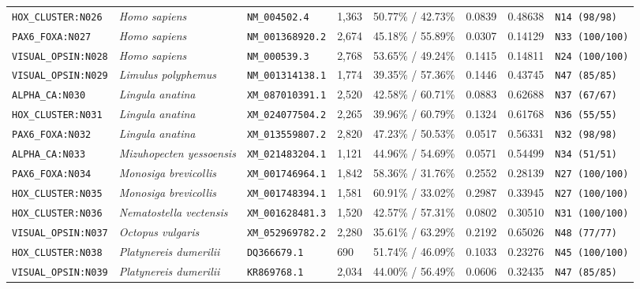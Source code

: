 \documentclass[10pt,letterpaper]{article}
\begin{document}
\begin{longtable}{llllllll}
\texttt{HOX\_CLUSTER:N026} & \textit{Homo sapiens} & \texttt{NM\_004502.4} & 1,363 & 50.77\% / 42.73\% & 0.0839 & 0.48638 & \texttt{N14 (98/98)} \\
\texttt{PAX6\_FOXA:N027} & \textit{Homo sapiens} & \texttt{NM\_001368920.2} & 2,674 & 45.18\% / 55.89\% & 0.0307 & 0.14129 & \texttt{N33 (100/100)} \\
\texttt{VISUAL\_OPSIN:N028} & \textit{Homo sapiens} & \texttt{NM\_000539.3} & 2,768 & 53.65\% / 49.24\% & 0.1415 & 0.14811 & \texttt{N24 (100/100)} \\
\texttt{VISUAL\_OPSIN:N029} & \textit{Limulus polyphemus} & \texttt{NM\_001314138.1} & 1,774 & 39.35\% / 57.36\% & 0.1446 & 0.43745 & \texttt{N47 (85/85)} \\
\texttt{ALPHA\_CA:N030} & \textit{Lingula anatina} & \texttt{XM\_087010391.1} & 2,520 & 42.58\% / 60.71\% & 0.0883 & 0.62688 & \texttt{N37 (67/67)} \\
\texttt{HOX\_CLUSTER:N031} & \textit{Lingula anatina} & \texttt{XM\_024077504.2} & 2,265 & 39.96\% / 60.79\% & 0.1324 & 0.61768 & \texttt{N36 (55/55)} \\
\texttt{PAX6\_FOXA:N032} & \textit{Lingula anatina} & \texttt{XM\_013559807.2} & 2,820 & 47.23\% / 50.53\% & 0.0517 & 0.56331 & \texttt{N32 (98/98)} \\
\texttt{ALPHA\_CA:N033} & \textit{Mizuhopecten yessoensis} & \texttt{XM\_021483204.1} & 1,121 & 44.96\% / 54.69\% & 0.0571 & 0.54499 & \texttt{N34 (51/51)} \\
\texttt{PAX6\_FOXA:N034} & \textit{Monosiga brevicollis} & \texttt{XM\_001746964.1} & 1,842 & 58.36\% / 31.76\% & 0.2552 & 0.28139 & \texttt{N27 (100/100)} \\
\texttt{HOX\_CLUSTER:N035} & \textit{Monosiga brevicollis} & \texttt{XM\_001748394.1} & 1,581 & 60.91\% / 33.02\% & 0.2987 & 0.33945 & \texttt{N27 (100/100)} \\
\texttt{HOX\_CLUSTER:N036} & \textit{Nematostella vectensis} & \texttt{XM\_001628481.3} & 1,520 & 42.57\% / 57.31\% & 0.0802 & 0.30510 & \texttt{N31 (100/100)} \\
\texttt{VISUAL\_OPSIN:N037} & \textit{Octopus vulgaris} & \texttt{XM\_052969782.2} & 2,280 & 35.61\% / 63.29\% & 0.2192 & 0.65026 & \texttt{N48 (77/77)} \\
\texttt{HOX\_CLUSTER:N038} & \textit{Platynereis dumerilii} & \texttt{DQ366679.1} & 690 & 51.74\% / 46.09\% & 0.1033 & 0.23276 & \texttt{N45 (100/100)} \\
\texttt{VISUAL\_OPSIN:N039} & \textit{Platynereis dumerilii} & \texttt{KR869768.1} & 2,034 & 44.00\% / 56.49\% & 0.0606 & 0.32435 & \texttt{N47 (85/85)} \\

\end{longtable}
\end{document}

